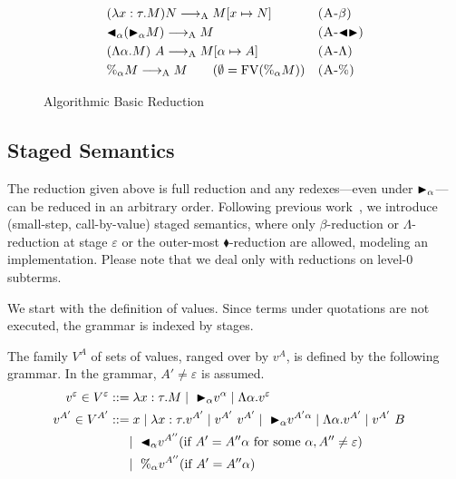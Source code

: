 \begin{figure}[tbp]
    \begin{center}
        \begin{align*}
            & (\lambda x:\tau.M) N \longrightarrow_{\text{A}} M[x \mapsto N]       &  & \textsc{(A-$\beta$)}   \\
            & {\mathop{\blacktriangleleft}}_\alpha ({\mathop{\blacktriangleright}}_\alpha M) \longrightarrow_{\text{A}} M              &  & \textsc{(A-${\mathop{\blacktriangleleft}}{\mathop{\blacktriangleright}}$)} \\
            & (\Lambda \alpha.M)\ A \longrightarrow_{\text{A}} M[\alpha \mapsto A] &  & \textsc{(A-$\Lambda$)} \\
            & \%_\alpha M \longrightarrow_{\text{A}} M \qquad (\emptyset = \text{FV}(\%_\alpha M)) &  & \textsc{(A-$\%$)}
        \end{align*}
    \end{center}
    \caption{Algorithmic Basic Reduction}
    \label{fig:algorithmic-reduction}
\end{figure}

\subsection{Staged Semantics}

The reduction given above is full reduction and any redexes---even under
${\mathop{\blacktriangleright}}_\alpha$---can be reduced in an arbitrary order.  Following previous
work~\cite{Hanada2014}, we introduce (small-step, call-by-value) staged
semantics, where only $\beta$-reduction or $\Lambda$-reduction at stage
$\varepsilon$ or the outer-most $\blacklozenge$-reduction are allowed, modeling
an implementation. Please note that we deal only with reductions on level-0
subterms.

We start with the definition of values. Since terms under quotations are
not executed, the grammar is indexed by stages.

\begin{definition}[Values]
  The family $V^A$ of sets of values, ranged over by $v^A$,
  is defined by the following grammar.  In the grammar, $A' \neq \varepsilon$ is assumed.
  \begin{align*}
    v^\varepsilon \in V^\varepsilon & ::= \lambda x:\tau.M \mid\ {\mathop{\blacktriangleright}}_\alpha v^\alpha \mid \Lambda\alpha.v^\varepsilon                                             & \\
    v^{A'} \in V^{A'}               & ::= x \mid \lambda x:\tau.v^{A'} \mid v^{A'}\ v^{A'} \mid\ {\mathop{\blacktriangleright}}_\alpha v^{A'\alpha} \mid \Lambda\alpha.v^{A'} \mid v^{A'}\ B & \\
                                    & \quad\   \mid\ {\mathop{\blacktriangleleft}}_\alpha v^{A''} (\text{if } A' = A''\alpha \text{ for some } \alpha, A'' \neq \varepsilon)               & \\
                                    & \quad\   \mid\ \%_\alpha v^{A''} (\text{if } A' = A''\alpha)
  \end{align*}
\end{definition}

